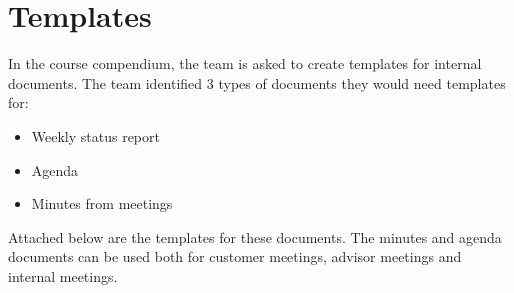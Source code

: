 \documentclass[11pt,a4paper,titlepage,oneside]{report}
\begin{document}
\chapter{Templates}
In the \gls{course compendium}, the team is asked to create templates for internal documents. The team identified 3 types of documents they would need templates for:

\begin{itemize}
\item Weekly status report
\item Agenda
\item Minutes from meetings
\end{itemize}

Attached below are the templates for these documents. The minutes and agenda documents can be used both for customer meetings, advisor meetings and internal meetings.




\end{document}
